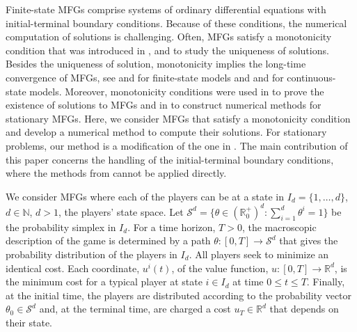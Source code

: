 \documentclass[12pt]{amsart}
\newcommand{\Rr}{{\mathbb{R}}}
\newcommand{\Nn}{{\mathbb{N}}}
\newcommand{\1}{{\chi}}
\newcommand{\Ss}{\mathcal{S}}
\theoremstyle{definition}
\begin{document}
   Finite-state MFGs comprise systems of ordinary differential equations with initial-terminal boundary conditions. 
        Because of these conditions, the numerical computation of solutions is challenging. 
    Often, MFGs satisfy a monotonicity condition that was introduced in \cite{ll1}, and \cite{ll2} to study the uniqueness of solutions. 
   Besides the uniqueness of solution, monotonicity implies the long-time convergence of MFGs, see  \cite{FG} and \cite{GMS2} for finite-state models and \cite{CLLP} and \cite{cllp13} for continuous-state models. 
   Moreover, monotonicity conditions were used in \cite{FG2} to 
   prove the existence of solutions to MFGs and in \cite{FG}
   to construct numerical methods for stationary MFGs.   
        Here, we consider MFGs that satisfy a monotonicity condition and develop a numerical method to compute their solutions. For stationary 
        problems, our method is a modification of the one in \cite{FG}. The main contribution of this paper concerns the handling of the initial-terminal boundary conditions, where the methods from \cite{FG} cannot be applied directly. 
   

        We consider MFGs where each of the players can be at a state in $I_d=\{1,\ldots,d\}$, $d\in \Nn$, $d>1$,  the players' state space.
        Let $\Ss^d=\{\theta\in (\Rr_0^+)^d : \sum_{i=1}^d \theta^i=1\}$ be the probability simplex in $I_d$. 
        For a time horizon, $T>0$, the macroscopic description of the game is determined by a path $\theta: [0,T] \to \Ss^d$ that gives the probability distribution of the players in $I_d$. 
        All players seek to minimize an identical cost. 
        Each coordinate, $u^i(t)$, of the value function,  $u: [0,T] \to \Rr^d$,  is the minimum cost for a typical player at state $i\in I_d$ at time $0\leq t\leq T$. 
        Finally, at the initial time, the players are distributed according to the probability vector $\theta_0\in \Ss^d$ and, at the terminal time, are charged a cost $u_T\in \Rr^d$ that depends on their state. 
\end{document}
